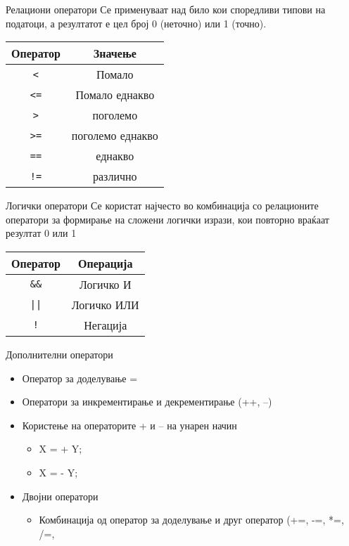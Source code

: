 \begin{frame}{Релациони оператори}
Се применуваат над било кои споредливи типови на податоци, а резултатот е цел број 0 (неточно) или 1 (точно).
\begin{center}
\begin{tabular}{c|c}
\textbf{Оператор} & \textbf{Значење}\\
\hline
\texttt{<} & Помало \\
\texttt{<=} & Помало еднакво \\
\texttt{>} & поголемо \\
\texttt{>=} & поголемо еднакво \\
\texttt{==} & еднакво \\
\texttt{!=} & различно
\end{tabular}
\end{center}
\end{frame}

\begin{frame}{Логички оператори}
Се користат најчесто во комбинација со релационите оператори за формирање на сложени логички изрази, кои повторно враќаат резултат 0 или 1
\linebreak
\begin{center}
\begin{tabular}{c|c}
\textbf{Оператор} & \textbf{Операција}\\
\hline
\texttt{\&\&} & Логичко И \\
\texttt{||} & Логичко ИЛИ \\
\texttt{!} & Негација
\end{tabular}
\end{center}
\end{frame}

\begin{frame}{Дополнителни оператори}
\begin{itemize}
\item Оператор за доделување =
\item Оператори за инкрементирање и декрементирање (++, --)
\item Користење на операторите + и – на унарен начин
\begin{itemize}
\item X = + Y;
\item X = - Y;
\end{itemize}
\item Двојни оператори
\begin{itemize}
\item Комбинација од оператор за доделување и друг оператор (+=, -=, *=, /=, %
\end{itemize}
\end{itemize}
\end{frame}

